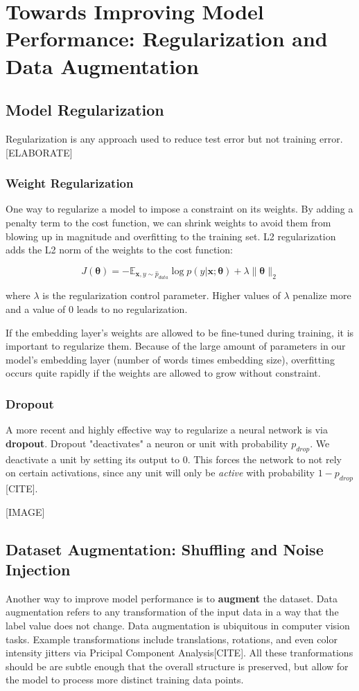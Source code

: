 
\chapter{Towards Improving Model Performance: Regularization and Data Augmentation}

\section{Model Regularization}
Regularization is any approach used to reduce test error but not training error.
[ELABORATE]

\subsection{Weight Regularization}
One way to regularize a model to impose a constraint on its weights. By adding a penalty term to the cost function, we can shrink weights to avoid
them from blowing up in magnitude and overfitting to the training set. L2 regularization
adds the L2 norm of the weights to the cost function:

\[J(\bm{\theta}) = -\mathbb{E}_{\bm{x},y \sim \hat p_{data}} \log \textit{p}(y|\bm{x};\bm{\theta}) + \lambda \lVert \bm{\theta} \rVert_{2}\]

where $\lambda$ is the regularization control parameter. Higher values of $\lambda$ penalize more and a value of 0 leads to no regularization.

If the embedding layer's weights are allowed to be fine-tuned during training, it is
important to regularize them. Because of the large amount of parameters in our model's embedding layer (number of words times embedding size),
overfitting occurs quite rapidly if the weights are allowed to grow without constraint.

\subsection{Dropout}
A more recent and highly effective way to regularize a neural network is via \textbf{dropout}.
Dropout "deactivates" a neuron or unit with probability $p_{drop}$. We deactivate a unit
by setting its output to 0. This forces the network to not rely on certain
activations, since any unit will only be \textit{active} with probability $1-p_{drop}$[CITE].

[IMAGE]
\section{Dataset Augmentation: Shuffling and Noise Injection}
Another way to improve model performance is to \textbf{augment} the dataset.
Data augmentation refers to any transformation of the input data in a way that
the label value does not change. Data augmentation is ubiquitous in computer vision tasks. Example transformations include translations, rotations, and even color intensity jitters via Pricipal Component
Analysis[CITE]. All these tranformations should be are subtle enough that the overall structure is preserved, but
allow for the model to process more distinct training data points.

